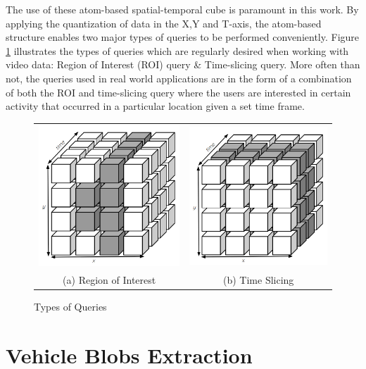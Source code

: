 The use of these atom-based spatial-temporal cube is paramount in this work. By applying the quantization of data in the X,Y and T-axis, the atom-based structure enables two major types of queries to be performed conveniently. Figure \ref{fig:typesofQuery} illustrates the types of queries which are regularly desired when working with video data: Region of Interest (ROI) query \& Time-slicing query. More often than not, the queries used in real world applications are in the form of a combination of both the ROI and time-slicing query where the users are interested in certain activity that occurred in a particular location given a set time frame. 



\begin{figure}[htb!]
  \centering
  

\begin{tabular}{cc}
 \includegraphics[width=0.4\linewidth]{image/general/atom_ROI.PNG} &  \includegraphics[width=0.4\linewidth]{image/general/atom_time_slicing.PNG}\\
(a) Region of Interest & (b) Time Slicing
\end{tabular}


\caption{Types of Queries} \label{fig:typesofQuery}
\end{figure}



\section{Vehicle Blobs Extraction}
\label{subsection:fundamental}

